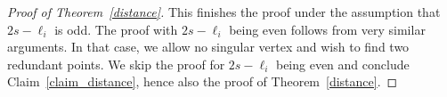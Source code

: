 \documentclass[11pt]{article}
\theoremstyle{definition}
\begin{document}
\begin{proof}[Proof of Theorem~\ref{distance}]
    This finishes the proof under the assumption that $2s-\ell_i$ is odd. The proof with $2s-\ell_i$ being even follows from very similar arguments. In that case, we allow no singular vertex and wish to find two redundant points. We skip the proof for $2s-\ell_i$ being even and conclude Claim~\ref{claim_distance}, hence also the proof of Theorem~\ref{distance}.
\end{proof}



\end{document}
